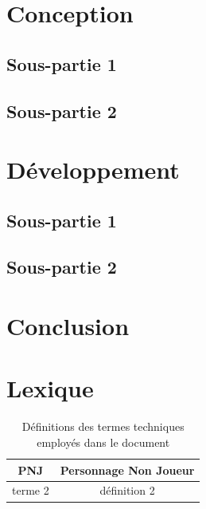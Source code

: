 \documentclass[a4paper,12pt]{article}
\begin{document}
\section{Conception}

\subsection{Sous-partie 1}

\subsection{Sous-partie 2}



\section{Développement}

\subsection{Sous-partie 1}

\subsection{Sous-partie 2}



\section{Conclusion}



\newpage
\appendix

\section{Lexique}

\begin{table}[h]
    \centering
    \begin{tabular}{c c}
	\toprule
	PNJ		& Personnage Non Joueur \\
	\midrule
	terme 2		& définition 2 \\
	\bottomrule
    \end{tabular}
    \caption{Définitions des termes techniques employés dans le document}
\end{table}
\end{document}
